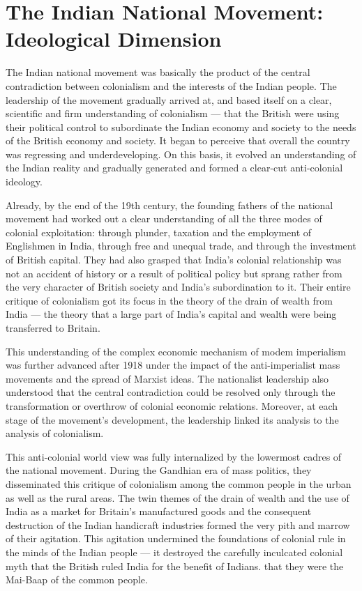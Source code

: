\chapter[Ideological Dimension of Indian National Movement]{The Indian National Movement: Ideological Dimension}\label{chapter:CH39}

The Indian national movement was basically the product of the central contradiction between colonialism and the interests of the Indian people. The leadership of the movement gradually arrived at, and based itself on a clear, scientific and firm understanding of colonialism --- that the British were using their political control to subordinate the Indian economy and society to the needs of the British economy and society. It began to perceive that overall the country was regressing and underdeveloping. On this basis, it evolved an understanding of the Indian reality and gradually generated and formed a clear-cut anti-colonial ideology.

Already, by the end of the 19th century, the founding fathers of the national movement had worked out a clear understanding of all the three modes of colonial exploitation: through plunder, taxation and the employment of Englishmen in India, through free and unequal trade, and through the investment of British capital. They had also grasped that India's colonial relationship was not an accident of history or a result of political policy but sprang rather from the very character of British society and India's subordination to it. Their entire critique of colonialism got its focus in the theory of the drain of wealth from India --- the theory that a large part of India's capital and wealth were being transferred to Britain.

This understanding of the complex economic mechanism of modem imperialism was further advanced after 1918 under the impact of the anti-imperialist mass movements and the spread of Marxist ideas. The nationalist leadership also understood that the central contradiction could be resolved only through the transformation or overthrow of colonial economic relations. Moreover, at each stage of the movement's development, the leadership linked its analysis to the analysis of colonialism.

This anti-colonial world view was fully internalized by the lowermost cadres of the national movement. During the Gandhian era of mass politics, they disseminated this critique of colonialism among the common people in the urban as well as the rural areas. The twin themes of the drain of wealth and the use of India as a market for Britain's manufactured goods and the consequent destruction of the Indian handicraft industries formed the very pith and marrow of their agitation. This agitation undermined the foundations of colonial rule in the minds of the Indian people --- it destroyed the carefully inculcated colonial myth that the British ruled India for the benefit of Indians. that they were the Mai-Baap of the common people.

